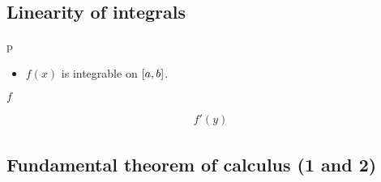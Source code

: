\subsection{Linearity of integrals}

\begin{property}{p}
\begin{precondition}
\begin{itemize}
    \item $f(x)$ is integrable on $\left[a,b \right]$.
\end{itemize}
\end{precondition}
\begin{claim}
    $f$
\end{claim}
\begin{Proof}

\begin{align*}
f'(y)
\end{align*}
\end{Proof}
\end{property}



\subsection{Fundamental theorem of calculus (1 and 2)}

